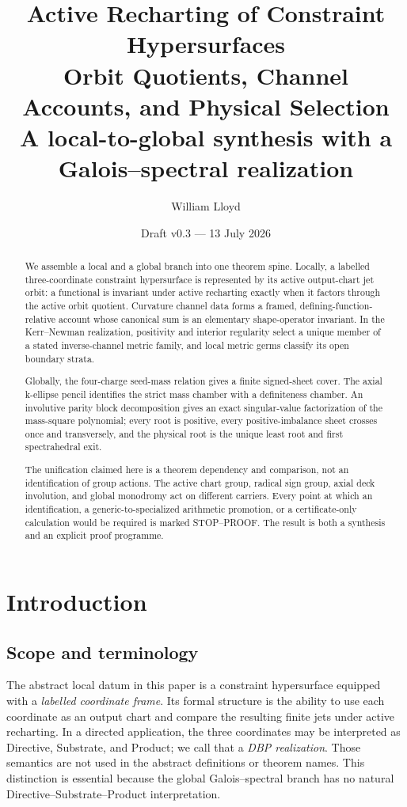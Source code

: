 \documentclass[11pt]{article}
\title{\textbf{Active Recharting of Constraint Hypersurfaces}\\
\large Orbit Quotients, Channel Accounts, and Physical Selection\\[4pt]
\large A local-to-global synthesis with a Galois--spectral realization}
\author{William Lloyd}
\date{Draft v0.3 --- 13 July 2026}
\theoremstyle{remark}
\begin{document}
\maketitle

\begin{abstract}
We assemble a local and a global branch into one theorem spine. Locally, a
labelled three-coordinate constraint hypersurface is represented by its active
output-chart jet orbit: a functional is invariant under active recharting
exactly when it factors through the active orbit quotient. Curvature channel
data forms a framed, defining-function-relative account whose canonical sum
is an elementary shape-operator invariant. In the Kerr--Newman realization,
positivity and interior regularity select a unique member of a stated
inverse-channel metric family, and local metric germs classify its open
boundary strata.

Globally, the four-charge seed-mass relation gives a finite signed-sheet
cover. The axial k-ellipse pencil identifies the strict mass chamber with a
definiteness chamber. An involutive parity block decomposition gives an exact
singular-value factorization of the mass-square polynomial; every root is
positive, every positive-imbalance sheet crosses once and transversely, and
the physical root is the unique least root and first spectrahedral exit.

The unification claimed here is a theorem dependency and comparison, not an
identification of group actions. The active chart group, radical sign group,
axial deck involution, and global monodromy act on different carriers. Every
point at which an identification, a generic-to-specialized arithmetic
promotion, or a certificate-only calculation would be required is marked
STOP--PROOF. The result is both a synthesis and an explicit proof programme.
\end{abstract}

\tableofcontents

\section{Introduction}

\subsection{Scope and terminology}

The abstract local datum in this paper is a constraint hypersurface equipped
with a \emph{labelled coordinate frame}. Its formal structure is the ability
to use each coordinate as an output chart and compare the resulting finite
jets under active recharting. In a directed application, the three coordinates
may be interpreted as Directive, Substrate, and Product; we call that a
\emph{DBP realization}. Those semantics are not used in the abstract
definitions or theorem names. This distinction is essential because the global
Galois--spectral branch has no natural Directive--Substrate--Product
interpretation.
\end{document}
